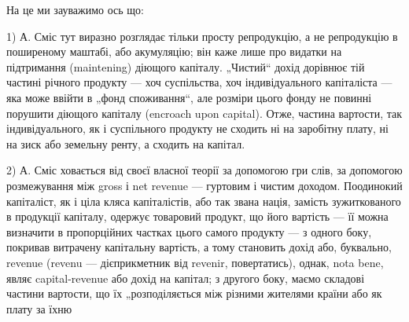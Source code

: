 На це ми зауважимо ось що:

1) А. Сміс тут виразно розглядає тільки просту репродукцію, а не
репродукцію в поширеному маштабі, або акумуляцію; він каже лише про
видатки на підтримання (maintening) діющого капіталу. „Чистий“ дохід
дорівнює тій частині річного продукту — хоч суспільства, хоч індивідуального
капіталіста — яка може ввійти в „фонд споживання“, але розміри
цього фонду не повинні порушити діющого капіталу (encroach upon capital).
Отже, частина вартости, так індивідуального, як і суспільного продукту
не сходить ні на заробітну плату, ні на зиск або земельну ренту,
а сходить на капітал.

2) А. Сміс ховається від своєї власної теорії за допомогою гри слів,
за допомогою розмежування між gross і net revenue — гуртовим і чистим
доходом. Поодинокий капіталіст, як і ціла кляса капіталістів, або так
звана нація, замість зужиткованого в продукції капіталу, одержує товаровий
продукт, що його вартість — її можна визначити в пропорційних частках
цього самого продукту — з одного боку, покривав витрачену капітальну
вартість, а тому становить дохід або, буквально, revenue (revenu — дієприкметник
від revenir, повертатись), однак, nota bene, являє capital-revenue або
дохід на капітал; з другого боку, маємо складові частини вартости, що
їх „розподіляється між різними жителями країни або як плату за їхню
\parbreak{}  %
